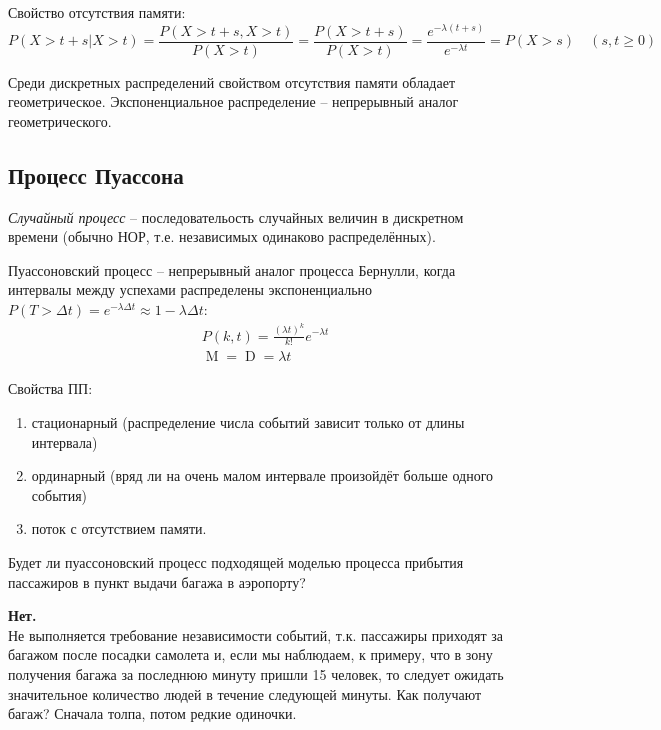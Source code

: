 \documentclass[a4paper,12pt,fleqn]{article}
\newenvironment{onsamepage} {\begin{minipage}{\textwidth}} {\end{minipage}}
\numberwithin{figure}{section}
\theoremstyle{definition}
\let\geqs\geqslant
\DeclareMathOperator{\M}{M}
\DeclareMathOperator{\D}{D}
\begin{document}
Свойство отсутствия памяти:
\[ P(X>t+s|X>t) = \frac{P(X>t+s,X>t)}{P(X>t)} = \frac{P(X>t+s)}{P(X>t)} =
   \frac{e^{-\lambda(t+s)}}{e^{-\lambda t}}=P(X>s) \quad (s,t\!\geqs\!0) \]

Среди дискретных распределений свойством отсутствия памяти обладает геометрическое.
Экспоненциальное распределение -- непрерывный аналог геометрического.


\subsection{Процесс Пуассона}

\textit{Случайный процесс} -- последовательость случайных величин в дискретном времени
(обычно НОР, т.е. независимых одинаково распределённых).

Пуассоновский процесс -- непрерывный аналог процесса Бернулли,
когда интервалы между успехами распределены экспоненциально
$P(T>\Delta t) = e^{-\lambda \Delta t} \approx 1-\lambda \Delta t$:
\begin{align*}
&	P(k,t) = \frac{(\lambda t)^k}{k!} e^{-\lambda t}	\\
&	\M = \D = \lambda t
\end{align*}


\begin{onsamepage}
Свойства ПП:
\begin{enumerate}
	\item стационарный (распределение числа событий зависит только от длины интервала)
	\item ординарный (вряд ли на очень малом интервале произойдёт больше одного события)
	\item поток с отсутствием памяти.
\end{enumerate}
\end{onsamepage}


\begin{onsamepage}
\begin{problem}
	Будет ли пуассоновский процесс подходящей моделью процесса
	прибытия пассажиров в пункт выдачи багажа в аэропорту?
\end{problem}
\begin{solution}
  \textbf{Нет.}\\
	Не выполняется требование независимости событий, т.к.
	пассажиры приходят за багажом после посадки самолета и, если мы наблюдаем,
	к примеру, что в зону получения багажа за последнюю минуту пришли 15 человек,
	то следует ожидать значительное количество людей в течение следующей минуты.
	Как получают багаж? Сначала толпа, потом редкие одиночки.
\end{solution}
\end{onsamepage}
\end{document}
